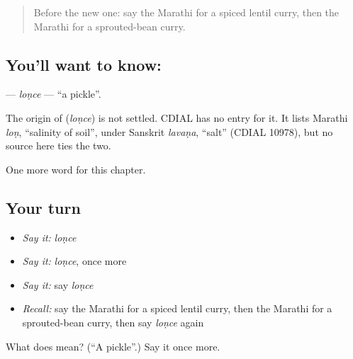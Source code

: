 \label{lesson:MR-C269-lonce}



\begin{quote}
Before the new one: say the Marathi for a spiced lentil curry, then the Marathi for a sprouted-bean curry.
\end{quote}

\subsection*{You'll want to know: }
\textbf{} — \emph{loṇce} — \textquotedblleft{}a pickle\textquotedblright{}.

\begin{cousinweb}
The origin of \textbf{} (\emph{loṇce}) is not settled. CDIAL has no entry for it. It lists Marathi \emph{loṇ}, \textquotedblleft{}salinity of soil\textquotedblright{}, under Sanskrit \emph{lavaṇa}, \textquotedblleft{}salt\textquotedblright{} (CDIAL 10978), but no source here ties the two.
\end{cousinweb}

\begin{grammarlens}[title={What you've built}]
One more word for this chapter.
\end{grammarlens}

\subsection*{Your turn}
\begin{itemize}
\raggedright
  \item \emph{Say it:} \emph{loṇce}
  \item \emph{Say it:} \emph{loṇce}, once more
  \item \emph{Say it:} say \emph{loṇce}
  \item \emph{Recall:} say the Marathi for a spiced lentil curry, then the Marathi for a sprouted-bean curry, then say \emph{loṇce} again
\end{itemize}

\begin{tcolorbox}[breakable,colback=teal!4,colframe=teal!35!black,title={Before you move on}]
What does  mean? (\textquotedblleft{}A pickle\textquotedblright{}.) Say it once more.
\end{tcolorbox}
